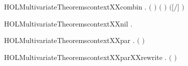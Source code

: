 \newcommand{\HOLMultivariateTheoremscontextXXbackwardXXrules}{\UseVerbatim{HOLMultivariateTheoremscontextXXbackwardXXrules}}
\begin{SaveVerbatim}{HOLMultivariateTheoremscontextXXcombin}
\HOLTokenTurnstile{} \HOLSymConst{\HOLTokenForall{}}  .
         \HOLSymConst{\HOLTokenConj{}}    \HOLSymConst{\HOLTokenConj{}}  \ensuremath{(} \ensuremath{)}  \HOLSymConst{\HOLTokenConj{}}
       \ensuremath{(}  \HOLSymConst{\ensuremath{=}}  \ensuremath{)} \HOLSymConst{\HOLTokenImp{}}
         \ensuremath{(}\ensuremath{[}\ensuremath{/}\ensuremath{]} \ensuremath{)}
\end{SaveVerbatim}
\newcommand{\HOLMultivariateTheoremscontextXXcombin}{\UseVerbatim{HOLMultivariateTheoremscontextXXcombin}}
\begin{SaveVerbatim}{HOLMultivariateTheoremscontextXXnil}
\HOLTokenTurnstile{} \HOLSymConst{\HOLTokenForall{}}.   
\end{SaveVerbatim}
\newcommand{\HOLMultivariateTheoremscontextXXnil}{\UseVerbatim{HOLMultivariateTheoremscontextXXnil}}
\begin{SaveVerbatim}{HOLMultivariateTheoremscontextXXpar}
\HOLTokenTurnstile{} \HOLSymConst{\HOLTokenForall{}}  .
         \ensuremath{(} \HOLSymConst{\ensuremath{\mid}} \ensuremath{)} \HOLSymConst{\HOLTokenImp{}}    \HOLSymConst{\HOLTokenConj{}}   
\end{SaveVerbatim}
\newcommand{\HOLMultivariateTheoremscontextXXpar}{\UseVerbatim{HOLMultivariateTheoremscontextXXpar}}
\begin{SaveVerbatim}{HOLMultivariateTheoremscontextXXparXXrewrite}
\HOLTokenTurnstile{} \HOLSymConst{\HOLTokenForall{}}  .
         \ensuremath{(} \HOLSymConst{\ensuremath{\mid}} \ensuremath{)} \HOLSymConst{\HOLTokenEquiv{}}    \HOLSymConst{\HOLTokenConj{}}   
\end{SaveVerbatim}
